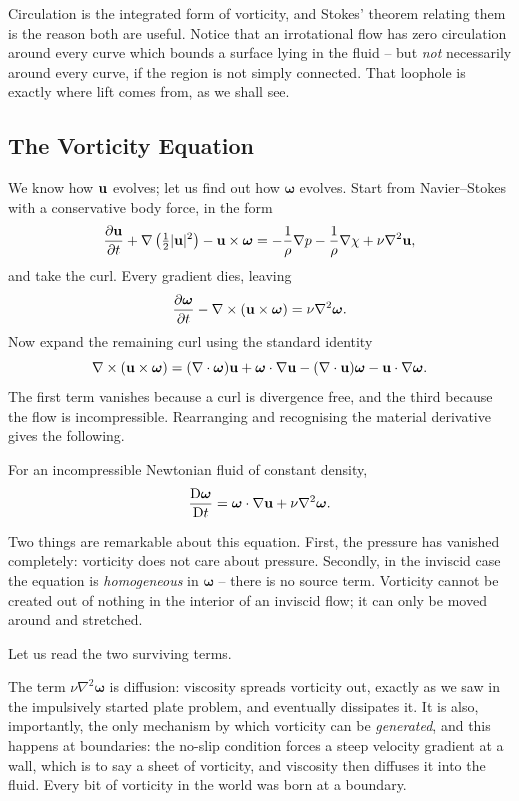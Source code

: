 \documentclass[a4paper]{scrartcl}
\newcommand{\D}{\mathrm{D}}
\newcommand{\Dt}[1]{\frac{\D #1}{\D t}}
\newcommand{\pd}[2]{\frac{\partial #1}{\partial #2}}
\newcommand{\bom}{\boldsymbol{\omega}}
\begin{document}
Circulation is the integrated form of vorticity, and Stokes' theorem relating them is the reason both are useful. Notice that an irrotational flow has zero circulation around every curve which bounds a surface lying in the fluid -- but \emph{not} necessarily around every curve, if the region is not simply connected. That loophole is exactly where lift comes from, as we shall see.

\subsection{The Vorticity Equation}

We know how $\mathbf{u}$ evolves; let us find out how $\bom$ evolves. Start from Navier--Stokes with a conservative body force, in the form
$$
\pd{\vv u}{t} + \nabla\left(\tfrac{1}{2}|\vv u|^2\right) - \vv u \times \bom = -\frac{1}{\rho}\nabla p - \frac{1}{\rho}\nabla \chi + \nu \nabla^2 \vv u,
$$
and take the curl. Every gradient dies, leaving
$$
\pd{\bom}{t} - \nabla \times (\vv u \times \bom) = \nu \nabla^2 \bom.
$$
Now expand the remaining curl using the standard identity
$$
\nabla \times (\vv u \times \bom) = (\nabla \cdot \bom)\vv u + \bom \cdot \nabla \vv u - (\nabla \cdot \vv u)\bom - \vv u \cdot \nabla \bom.
$$
The first term vanishes because a curl is divergence free, and the third because the flow is incompressible. Rearranging and recognising the material derivative gives the following.

\begin{proposition}
	For an incompressible Newtonian fluid of constant density,
	$$
	\Dt{\bom} = \bom \cdot \nabla \vv u + \nu \nabla^2 \bom.
	$$
\end{proposition}

Two things are remarkable about this equation. First, the pressure has vanished completely: vorticity does not care about pressure. Secondly, in the inviscid case the equation is \emph{homogeneous} in $\bom$ -- there is no source term. Vorticity cannot be created out of nothing in the interior of an inviscid flow; it can only be moved around and stretched.

Let us read the two surviving terms.

The term $\nu \nabla^2 \bom$ is diffusion: viscosity spreads vorticity out, exactly as we saw in the impulsively started plate problem, and eventually dissipates it. It is also, importantly, the only mechanism by which vorticity can be \emph{generated}, and this happens at boundaries: the no-slip condition forces a steep velocity gradient at a wall, which is to say a sheet of vorticity, and viscosity then diffuses it into the fluid. Every bit of vorticity in the world was born at a boundary.
\end{document}

